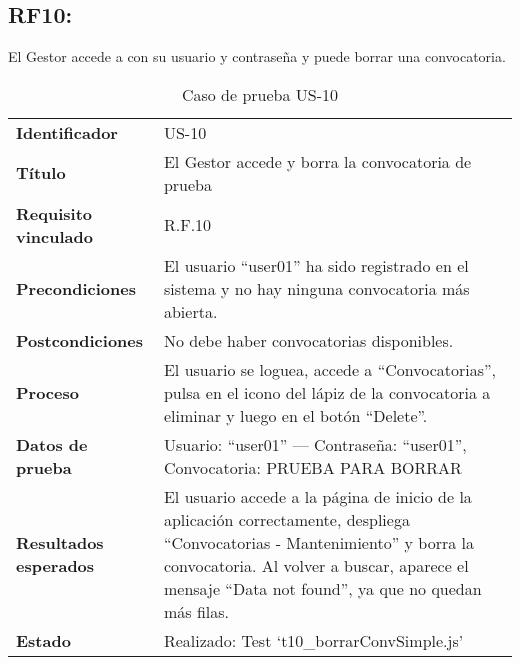 \subsection*{RF10:} El Gestor accede a con su usuario y contraseña y puede borrar una convocatoria.
\begin{table}[H]
	\centering
	\small
	\caption{Caso de prueba US-10}
	\label{tab:caso_us10}
	\begin{tabular}{>{\bfseries}l p{11cm}}
		Identificador & US-10 \\
		Título & El Gestor accede y borra la convocatoria de prueba \\
		Requisito vinculado & R.F.10 \\
		Precondiciones & El usuario “user01” ha sido registrado en el sistema y no hay ninguna convocatoria más abierta. \\
		Postcondiciones & No debe haber convocatorias disponibles. \\
		Proceso & El usuario se loguea, accede a “Convocatorias”, pulsa en el icono del lápiz de la convocatoria a eliminar y luego en el botón “Delete”. \\
		Datos de prueba & Usuario: “user01” — Contraseña: “user01”, Convocatoria: PRUEBA PARA BORRAR \\
		Resultados esperados & El usuario accede a la página de inicio de la aplicación correctamente, despliega “Convocatorias - Mantenimiento” y borra la convocatoria. Al volver a buscar, aparece el mensaje “Data not found”, ya que no quedan más filas. \\
		Estado & Realizado: Test `t10\_borrarConvSimple.js' \\
	\end{tabular}
\end{table}


